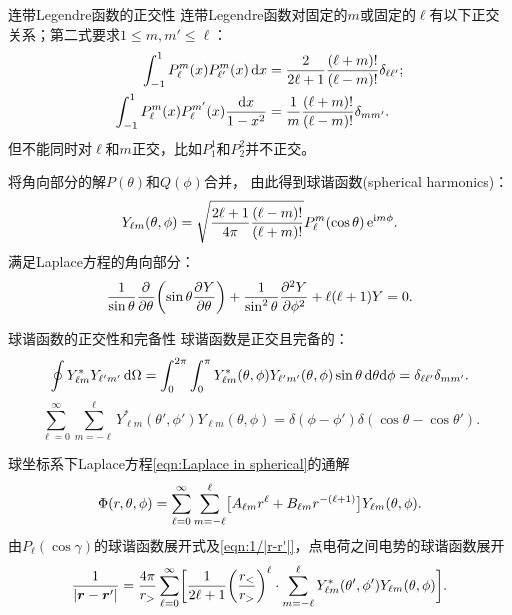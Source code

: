 \begin{theorem}
    {连带Legendre函数的正交性}{}
    连带Legendre函数对固定的$m$或固定的$\ell$有以下正交关系；第二式要求$1 \leq m,m' \leq \ell$：
    \begin{subequations}
        \begin{align}
            \int_{-1}^1P_\ell^m(x)P_{\ell'}^m(x)\d x &= \frac2{2\ell + 1}\frac{(\ell + m)!}{(\ell - m)!}\delta_{\ell\ell'};\\
            \int_{-1}^1P_\ell^m(x)P_\ell^{m'}(x)\frac{\d x}{1 - x^2} &= \frac1m\frac{(\ell + m)!}{(\ell - m)!}\delta_{mm'}.
        \end{align}
    \end{subequations}
    但不能同时对$\ell$和$m$正交，比如$P_1^1$和$P_2^2$并不正交。
\end{theorem}
将角向部分的解$P(\theta)$和$Q(\phi)$合并，
由此得到球谐函数(spherical harmonics)：
\begin{equation}
    Y_{\ell m}(\theta,\phi) = \sqrt{\frac{2\ell + 1}{4\pi}\frac{(\ell - m)!}{(\ell + m)!}}P_\ell^m(\cos\theta)\e^{\i m\phi}.
\end{equation}
满足Laplace方程的角向部分：
\[
    \frac1{\sin\theta}\pp\theta\biggp{\sin\theta\pv Y\theta} + \frac1{\sin^2\theta}\pv[2]Y\phi + \ell(\ell + 1)Y = 0.
\]
\begin{theorem}
    {球谐函数的正交性和完备性}{}
    球谐函数是正交且完备的：
    \begin{equation}
        \label{eq:ed-spherical-harmonic-orthogonality}
        \oint Y_{\ell m}\conj Y_{\ell'm'}\d\Omega = \int_0^{2\pi}\int_0^\pi Y_{\ell m}\conj(\theta,\phi) Y_{\ell'm'}(\theta,\phi)\sin\theta\d\theta\nd\phi = \delta_{\ell\ell'}\delta_{mm'}.
    \end{equation}
    \begin{equation}
        \sum_{\ell=0}^\infty\sum_{m=-\ell}^\ell Y_{\ell m}^*(\theta',\phi')Y_{\ell m}(\theta,\phi) = \delta(\phi - \phi')\delta(\cos\theta - \cos\theta').
    \end{equation}
\end{theorem}

球坐标系下Laplace方程\eqref{eqn:Laplace in spherical}的通解
\begin{equation}
    \Phi(r,\theta,\phi) = \sum_{\ell=0}^\infty\sum_{m=-\ell}^\ell\bigb{A_{\ell m}r^\ell + B_{\ell m}r^{-(\ell+1)}}Y_{\ell m}(\theta,\phi).
\end{equation}
由$P_\ell(\cos\gamma)$的球谐函数展开式及\eqref{eqn:1/|r-r'|}，点电荷之间电势的球谐函数展开
\begin{equation}
    \label{eqn:1/|r-r'|=YY}
    \frac1{\abs{\bm r - \bm r'}} = \frac{4\pi}{r_>}\sum_{\ell=0}^\infty\biggb{\frac1{2\ell + 1}\biggp{\frac{r_<}{r_>}}^\ell \cdot \sum_{m=-\ell}^\ell Y_{\ell m}\conj(\theta',\phi')Y_{\ell m}(\theta,\phi)}.
\end{equation}

